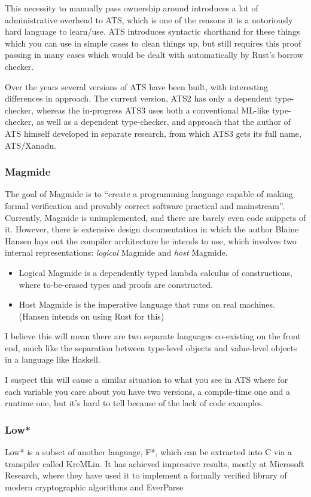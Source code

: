 \documentclass[12pt,twoside]{report}
\begin{document}
This necessity to manually pass ownership around introduces a lot of administrative overhead to ATS, which is one of the reasons it is a notoriously hard language to learn/use. ATS introduces syntactic shorthand for these things which you can use in simple cases to clean things up, but still requires this proof passing in many cases which would be dealt with automatically by Rust's borrow checker.

Over the years several versions of ATS have been built, with interesting differences in approach. The current version, ATS2 has only a dependent type-checker, whereas the in-progress ATS3 uses both a conventional ML-like type-checker, as well as a dependent type-checker, and approach that the author of ATS himself developed in separate research, from which ATS3 gets its full name, ATS/Xanadu.

\subsubsection{Magmide}
The goal of Magmide \citep{noauthor_magmidemagmide_2024} is to ``create a programming language capable of making formal verification and provably correct software practical and mainstream''. Currently, Magmide is unimplemented, and there are barely even code snippets of it. However, there is extensive design documentation in which the author Blaine Hansen lays out the compiler architecture he intends to use, which involves two internal representations: \textit{logical} Magmide and \textit{host} Magmide.

\begin{itemize}
  \item Logical Magmide is a dependently typed lambda calculus of constructions, where to-be-erased types and proofs are constructed.
  \item Host Magmide is the imperative language that runs on real machines. (Hansen intends on using Rust for this)
\end{itemize}

I believe this will mean there are two separate languages co-existing on the front end, much like the separation between type-level objects and value-level objects in a language like Haskell.

I suspect this will cause a similar situation to what you see in ATS where for each variable you care about you have two versions, a compile-time one and a runtime one, but it's hard to tell because of the lack of code examples.

\subsubsection{Low*}
Low*\citep{protzenko_low_2017} is a subset of another language, F*, which can be extracted into C via a transpiler called KreMLin. It has achieved impressive results, mostly at Microsoft Research, where they have used it to implement a formally verified library of modern cryptographic algorithms\citep{star_2024} and EverParse
\end{document}
